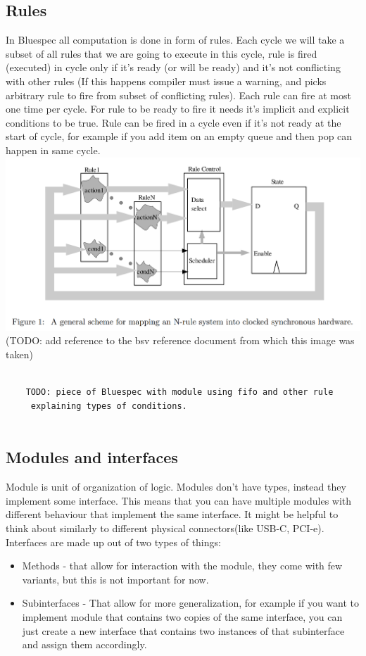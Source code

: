 \documentclass[12pt]{report}
\begin{document}
\subsection{Rules}
In Bluespec all computation is done in form of rules. 
Each cycle we will take a subset of all rules that we are going to execute in this cycle, rule is fired (executed) in cycle only if it's ready (or will be ready) and it's not conflicting with other rules (If this happens compiler must issue a warning, and picks arbitrary rule to fire from subset of conflicting rules). Each rule can fire at most one time per cycle. 
For rule to be ready to fire it needs it's implicit and explicit conditions to be true. 
Rule can be fired in a cycle even if it's not ready at the start of cycle, for example if you add item on an empty queue and then pop can happen in same cycle. \\
\includegraphics[width=\textwidth]{Rulemapping.png}
(TODO: add reference to the bsv reference document from which this image was taken)
\begin{verbatim}
        
    TODO: piece of Bluespec with module using fifo and other rule
     explaining types of conditions.
    
\end{verbatim}

\subsection{Modules and interfaces}
Module is unit of organization of logic. Modules don't have types, instead they implement some interface. This means that you can have multiple modules with different behaviour that implement the same interface. It might be helpful to think about similarly to different physical connectors(like USB-C, PCI-e). Interfaces are made up out of two types of things:
\begin{itemize}
    \item Methods - that allow for interaction with the module, they come with few variants, but this is not important for now.
    \item Subinterfaces - That allow for more generalization, for example if you want to implement module that contains two copies of the same interface, you can just create a new interface that contains two instances of that subinterface and assign them accordingly.
\end{itemize}
\end{document}
